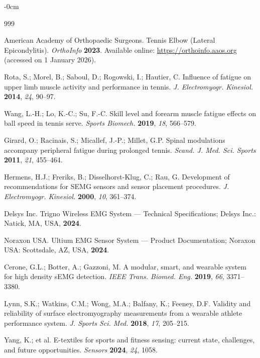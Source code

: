 \documentclass[sensors,article,submit,pdftex,moreauthors]{Definitions/mdpi}
\begin{document}
\begin{adjustwidth}{-\extralength}{0cm}

\begin{thebibliography}{999}

American Academy of Orthopaedic Surgeons.
Tennis Elbow (Lateral Epicondylitis).
{\em OrthoInfo}
{\bf 2023}.
Available online: \url{https://orthoinfo.aaos.org} (accessed on 1 January 2026).

Rota, S.; Morel, B.; Saboul, D.; Rogowski, I.; Hautier, C.
Influence of fatigue on upper limb muscle activity and performance in tennis.
{\em J. Electromyogr. Kinesiol.}
{\bf 2014}, {\em 24}, 90--97.

Wang, L.-H.; Lo, K.-C.; Su, F.-C.
Skill level and forearm muscle fatigue effects on ball speed in tennis serve.
{\em Sports Biomech.}
{\bf 2019}, {\em 18}, 566--579.

Girard, O.; Racinais, S.; Micallef, J.-P.; Millet, G.P.
Spinal modulations accompany peripheral fatigue during prolonged tennis.
{\em Scand. J. Med. Sci. Sports}
{\bf 2011}, {\em 21}, 455--464.

Hermens, H.J.; Freriks, B.; Disselhorst-Klug, C.; Rau, G.
Development of recommendations for SEMG sensors and sensor placement procedures.
{\em J. Electromyogr. Kinesiol.}
{\bf 2000}, {\em 10}, 361--374.

Delsys Inc.
Trigno Wireless EMG System --- Technical Specifications;
Delsys Inc.: Natick, MA, USA,
{\bf 2024}.

Noraxon USA.
Ultium EMG Sensor System --- Product Documentation;
Noraxon USA: Scottsdale, AZ, USA,
{\bf 2024}.

Cerone, G.L.; Botter, A.; Gazzoni, M.
A modular, smart, and wearable system for high density sEMG detection.
{\em IEEE Trans. Biomed. Eng.}
{\bf 2019}, {\em 66}, 3371--3380.

Lynn, S.K.; Watkins, C.M.; Wong, M.A.; Balfany, K.; Feeney, D.F.
Validity and reliability of surface electromyography measurements from a wearable
athlete performance system.
{\em J. Sports Sci. Med.}
{\bf 2018}, {\em 17}, 205--215.

Yang, K.; et al.
E-textiles for sports and fitness sensing: current state, challenges, and future
opportunities.
{\em Sensors}
{\bf 2024}, {\em 24}, 1058.


\end{thebibliography}
\end{adjustwidth}
\end{document}
